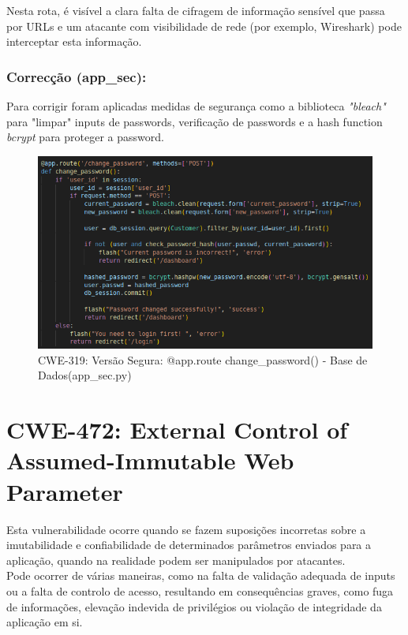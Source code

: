 Nesta rota, é visível a clara falta de cifragem de informação sensível que passa por URLs e  um atacante com visibilidade de rede (por exemplo, Wireshark) pode interceptar esta informação.

\subsubsection{Correcção (app\_sec):}
Para corrigir foram aplicadas medidas de segurança como a biblioteca \textit{"bleach"} para "limpar" inputs de passwords, verificação de passwords e a hash function \textit{bcrypt} para proteger a password. 

\begin{figure}[H]
  \centering
  \includegraphics[width=16cm]{images/CWE-319-cod2s.png}
  \caption{CWE-319: Versão Segura:  @app.route change\_password() - Base de Dados(app\_sec.py)}
  \label{fig:cwe319-cod2s}
\end{figure}
%
%
\section{CWE-472:  External Control of Assumed-Immutable Web Parameter}
\label{sec.cwe472}
Esta vulnerabilidade ocorre quando se fazem suposições incorretas sobre a imutabilidade e confiabilidade de determinados parâmetros enviados para a aplicação, quando na realidade podem ser manipulados por atacantes. \\
Pode ocorrer de várias maneiras, como na falta de validação adequada de inputs ou a falta de controlo de acesso, resultando em consequências graves, como fuga de informações, elevação indevida de privilégios ou violação de integridade da aplicação em si.

